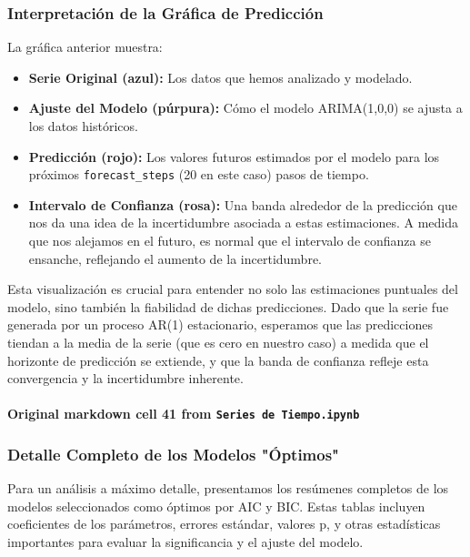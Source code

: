 \documentclass[
  11pt,
]{article}
\providecommand{\tightlist}{%
  \setlength{\itemsep}{0pt}\setlength{\parskip}{0pt}}
\begin{document}
\subsubsection{Interpretación de la Gráfica de Predicción}\label{interpretaciuxf3n-de-la-gruxe1fica-de-predicciuxf3n}

La gráfica anterior muestra:

\begin{itemize}
\tightlist
\item
  \textbf{Serie Original (azul):} Los datos que hemos analizado y modelado.
\item
  \textbf{Ajuste del Modelo (púrpura):} Cómo el modelo ARIMA(1,0,0) se ajusta a los datos históricos.
\item
  \textbf{Predicción (rojo):} Los valores futuros estimados por el modelo para los próximos \texttt{forecast\_steps} (20 en este caso) pasos de tiempo.
\item
  \textbf{Intervalo de Confianza (rosa):} Una banda alrededor de la predicción que nos da una idea de la incertidumbre asociada a estas estimaciones. A medida que nos alejamos en el futuro, es normal que el intervalo de confianza se ensanche, reflejando el aumento de la incertidumbre.
\end{itemize}

Esta visualización es crucial para entender no solo las estimaciones puntuales del modelo, sino también la fiabilidad de dichas predicciones. Dado que la serie fue generada por un proceso AR(1) estacionario, esperamos que las predicciones tiendan a la media de la serie (que es cero en nuestro caso) a medida que el horizonte de predicción se extiende, y que la banda de confianza refleje esta convergencia y la incertidumbre inherente.

\paragraph{\texorpdfstring{Original markdown cell 41 from \texttt{Series\ de\ Tiempo.ipynb}}{Original markdown cell 41 from Series de Tiempo.ipynb}}\label{original-markdown-cell-41-from-series-de-tiempoipynb}

\subsubsection{Detalle Completo de los Modelos "Óptimos"}\label{detalle-completo-de-los-modelos-uxf3ptimos}

Para un análisis a máximo detalle, presentamos los resúmenes completos de los modelos seleccionados como óptimos por AIC y BIC. Estas tablas incluyen coeficientes de los parámetros, errores estándar, valores p, y otras estadísticas importantes para evaluar la significancia y el ajuste del modelo.
\end{document}
